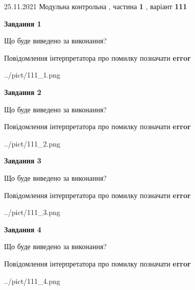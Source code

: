 \documentclass[10pt, ukrainian]{article}
\begin{document}
{25.11.2021 Модульна контрольна , частина \textbf { 1 }, варіант  \No \textbf { 111 }\par}
{
\begin {large}

{\begin {center}\textbf{Завдання 1}\end {center}}\par
Що буде виведено за виконання? \par
Повідомлення інтерпретатора про помилку позначати \textbf{error}

\begin{center}
	{../pict/111_1.png}
\end{center}
\newpage

{\begin {center}\textbf{Завдання 2}\end {center}}\par
Що буде виведено за виконання? \par
Повідомлення інтерпретатора про помилку позначати \textbf{error}

\begin{center}
	{../pict/111_2.png}
\end{center}
\newpage

{\begin {center}\textbf{Завдання 3}\end {center}}\par
Що буде виведено за виконання? \par
Повідомлення інтерпретатора про помилку позначати \textbf{error}

\begin{center}
	{../pict/111_3.png}
\end{center}
\newpage

{\begin {center}\textbf{Завдання 4}\end {center}}\par
Що буде виведено за виконання? \par
Повідомлення інтерпретатора про помилку позначати \textbf{error}

\begin{center}
	{../pict/111_4.png}
\end{center}
\newpage


\end{large}}
\end{document}
